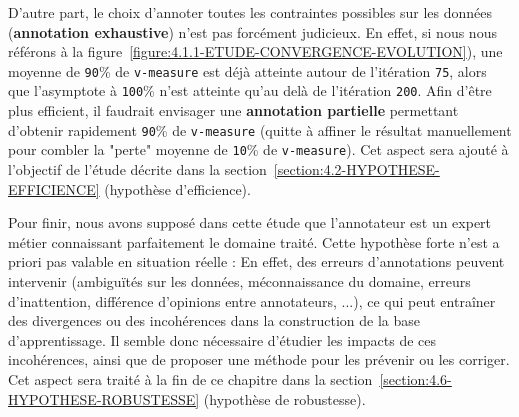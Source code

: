 			D'autre part, le choix d'annoter toutes les contraintes possibles sur les données (\textbf{annotation exhaustive}) n'est pas forcément judicieux.
			En effet, si nous nous référons à la figure~\ref{figure:4.1.1-ETUDE-CONVERGENCE-EVOLUTION}), une moyenne de \texttt{90}\% de \texttt{v-measure} est déjà atteinte autour de l'itération \texttt{75}, alors que l'asymptote à \texttt{100}\% n'est atteinte qu'au delà de l'itération \texttt{200}. Afin d'être plus efficient, il faudrait envisager une \textbf{annotation partielle} permettant d'obtenir rapidement \texttt{90}\% de \texttt{v-measure} (quitte à affiner le résultat manuellement pour combler la "perte" moyenne de \texttt{10}\% de \texttt{v-measure}).
			Cet aspect sera ajouté à l'objectif de l'étude décrite dans la section~\ref{section:4.2-HYPOTHESE-EFFICIENCE} (hypothèse d'efficience).
			
			Pour finir, nous avons supposé dans cette étude que l'annotateur est un expert métier connaissant parfaitement le domaine traité.
			Cette hypothèse forte n'est a priori pas valable en situation réelle : En effet, des erreurs d'annotations peuvent intervenir (ambiguïtés sur les données, méconnaissance du domaine, erreurs d'inattention, différence d'opinions entre annotateurs, ...), ce qui peut entraîner des divergences ou des incohérences dans la construction de la base d'apprentissage.
			Il semble donc nécessaire d'étudier les impacts de ces incohérences, ainsi que de proposer une méthode pour les prévenir ou les corriger.
			Cet aspect sera traité à la fin de ce chapitre dans la section~\ref{section:4.6-HYPOTHESE-ROBUSTESSE} (hypothèse de robustesse).